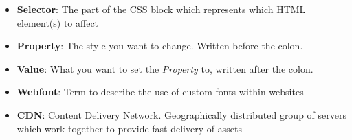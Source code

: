 \begin{itemize}[leftmargin=*]
    \item
        \textbf{Selector}:
        The part of the CSS block which represents which HTML element(s) to affect
    \item
        \textbf{Property}:
        The style you want to change. Written before the colon.
    \item
        \textbf{Value}:
        What you want to set the \textit{Property} to, written after the colon.
    \item
        \textbf{Webfont}:
        Term to describe the use of custom fonts within websites
    \item
        \textbf{CDN}:
        Content Delivery Network. Geographically distributed group of servers which work together to provide fast delivery of assets
\end{itemize}
